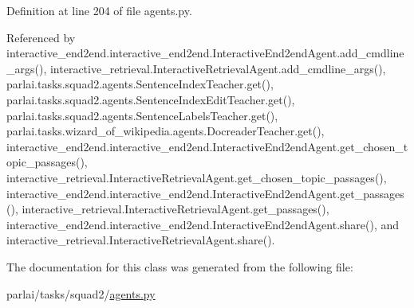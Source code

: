 Definition at line 204 of file agents.\+py.



Referenced by interactive\+\_\+end2end.\+interactive\+\_\+end2end.\+Interactive\+End2end\+Agent.\+add\+\_\+cmdline\+\_\+args(), interactive\+\_\+retrieval.\+Interactive\+Retrieval\+Agent.\+add\+\_\+cmdline\+\_\+args(), parlai.\+tasks.\+squad2.\+agents.\+Sentence\+Index\+Teacher.\+get(), parlai.\+tasks.\+squad2.\+agents.\+Sentence\+Index\+Edit\+Teacher.\+get(), parlai.\+tasks.\+squad2.\+agents.\+Sentence\+Labels\+Teacher.\+get(), parlai.\+tasks.\+wizard\+\_\+of\+\_\+wikipedia.\+agents.\+Docreader\+Teacher.\+get(), interactive\+\_\+end2end.\+interactive\+\_\+end2end.\+Interactive\+End2end\+Agent.\+get\+\_\+chosen\+\_\+topic\+\_\+passages(), interactive\+\_\+retrieval.\+Interactive\+Retrieval\+Agent.\+get\+\_\+chosen\+\_\+topic\+\_\+passages(), interactive\+\_\+end2end.\+interactive\+\_\+end2end.\+Interactive\+End2end\+Agent.\+get\+\_\+passages(), interactive\+\_\+retrieval.\+Interactive\+Retrieval\+Agent.\+get\+\_\+passages(), interactive\+\_\+end2end.\+interactive\+\_\+end2end.\+Interactive\+End2end\+Agent.\+share(), and interactive\+\_\+retrieval.\+Interactive\+Retrieval\+Agent.\+share().



The documentation for this class was generated from the following file\+:\begin{DoxyCompactItemize}
\item 
parlai/tasks/squad2/\hyperlink{parlai_2tasks_2squad2_2agents_8py}{agents.\+py}\end{DoxyCompactItemize}
